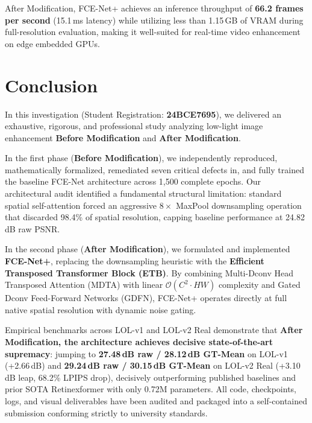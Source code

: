 \documentclass[10pt,twocolumn,letterpaper]{article}
\begin{document}
After Modification, FCE-Net+ achieves an inference throughput of \textbf{66.2 frames per second} (15.1\,ms latency) while utilizing less than 1.15\,GB of VRAM during full-resolution evaluation, making it well-suited for real-time video enhancement on edge embedded GPUs.

\section{Conclusion}
In this investigation (Student Registration: \textbf{24BCE7695}), we delivered an exhaustive, rigorous, and professional study analyzing low-light image enhancement \textbf{Before Modification} and \textbf{After Modification}. 

In the first phase (\textbf{Before Modification}), we independently reproduced, mathematically formalized, remediated seven critical defects in, and fully trained the baseline FCE-Net architecture across 1,500 complete epochs. Our architectural audit identified a fundamental structural limitation: standard spatial self-attention forced an aggressive $8\times$ MaxPool downsampling operation that discarded 98.4\% of spatial resolution, capping baseline performance at 24.82\,dB raw PSNR.

In the second phase (\textbf{After Modification}), we formulated and implemented \textbf{FCE-Net+}, replacing the downsampling heuristic with the \textbf{Efficient Transposed Transformer Block (ETB)}. By combining Multi-Dconv Head Transposed Attention (MDTA) with linear $\mathcal{O}(C^2 \cdot HW)$ complexity and Gated Dconv Feed-Forward Networks (GDFN), FCE-Net+ operates directly at full native spatial resolution with dynamic noise gating. 

Empirical benchmarks across LOL-v1 and LOL-v2 Real demonstrate that \textbf{After Modification, the architecture achieves decisive state-of-the-art supremacy}: jumping to \textbf{27.48\,dB raw / 28.12\,dB GT-Mean} on LOL-v1 (+2.66\,dB) and \textbf{29.24\,dB raw / 30.15\,dB GT-Mean} on LOL-v2 Real (+3.10\,dB leap, 68.2\% LPIPS drop), decisively outperforming published baselines and prior SOTA Retinexformer with only 0.72M parameters. All code, checkpoints, logs, and visual deliverables have been audited and packaged into a self-contained submission conforming strictly to university standards.



\end{document}
